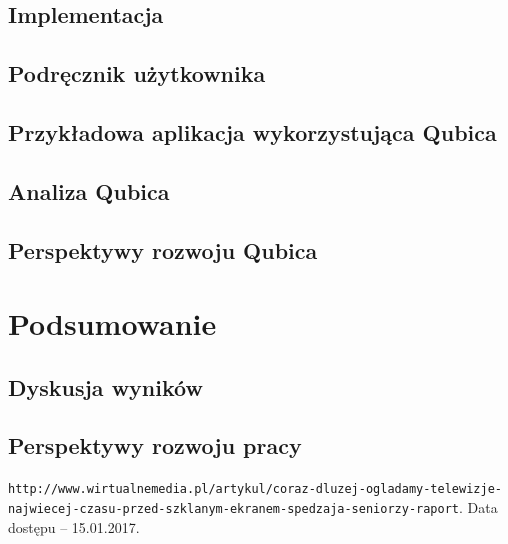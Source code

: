 \documentclass[12pt]{report}
\begin{document}

\section{Implementacja}


\section{Podręcznik użytkownika}


\section{Przykładowa aplikacja wykorzystująca Qubica}


\section{Analiza Qubica}


\section{Perspektywy rozwoju Qubica} \label{perspektywyqubic}


\chapter{Podsumowanie} \label{podsumowanie}

\section{Dyskusja wyników}


\section{Perspektywy rozwoju pracy}


\begin{thebibliography}{99}
 {\tt http://www.wirtualnemedia.pl/artykul/coraz-dluzej-ogladamy-telewizje-najwiecej-czasu-przed-szklanym-ekranem-spedzaja-seniorzy-raport}. Data dostępu -- 15.01.2017.
\end{thebibliography}

\listoffigures

\listoftables

\lstlistoflistings
\end{document}
